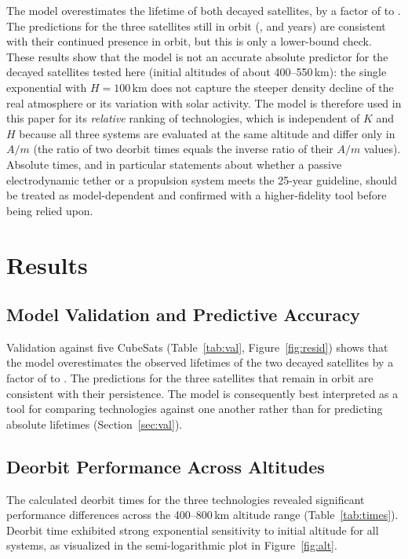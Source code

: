 \documentclass[11pt,a4paper]{article}
\begin{document}
The model overestimates the lifetime of both decayed satellites, by a factor of \ValLo{} to \ValHi{}. The predictions for the three satellites still in orbit (\ValEstFour{}, \ValAauThree{} and \ValPerseus{} years) are consistent with their continued presence in orbit, but this is only a lower-bound check. These results show that the model is not an accurate absolute predictor for the decayed satellites tested here (initial altitudes of about 400--550\,km): the single exponential with $H=100$\,km does not capture the steeper density decline of the real atmosphere or its variation with solar activity. The model is therefore used in this paper for its \emph{relative} ranking of technologies, which is independent of $K$ and $H$ because all three systems are evaluated at the same altitude and differ only in $A/m$ (the ratio of two deorbit times equals the inverse ratio of their $A/m$ values). Absolute times, and in particular statements about whether a passive electrodynamic tether or a propulsion system meets the 25-year guideline, should be treated as model-dependent and confirmed with a higher-fidelity tool before being relied upon.

\section{Results}
\subsection{Model Validation and Predictive Accuracy}
Validation against five CubeSats (Table~\ref{tab:val}, Figure~\ref{fig:resid}) shows that the model overestimates the observed lifetimes of the two decayed satellites by a factor of \ValLo{} to \ValHi{}. The predictions for the three satellites that remain in orbit are consistent with their persistence. The model is consequently best interpreted as a tool for comparing technologies against one another rather than for predicting absolute lifetimes (Section~\ref{sec:val}).

\subsection{Deorbit Performance Across Altitudes}
The calculated deorbit times for the three technologies revealed significant performance differences across the 400--800\,km altitude range (Table~\ref{tab:times}). Deorbit time exhibited strong exponential sensitivity to initial altitude for all systems, as visualized in the semi-logarithmic plot in Figure~\ref{fig:alt}.
\end{document}
